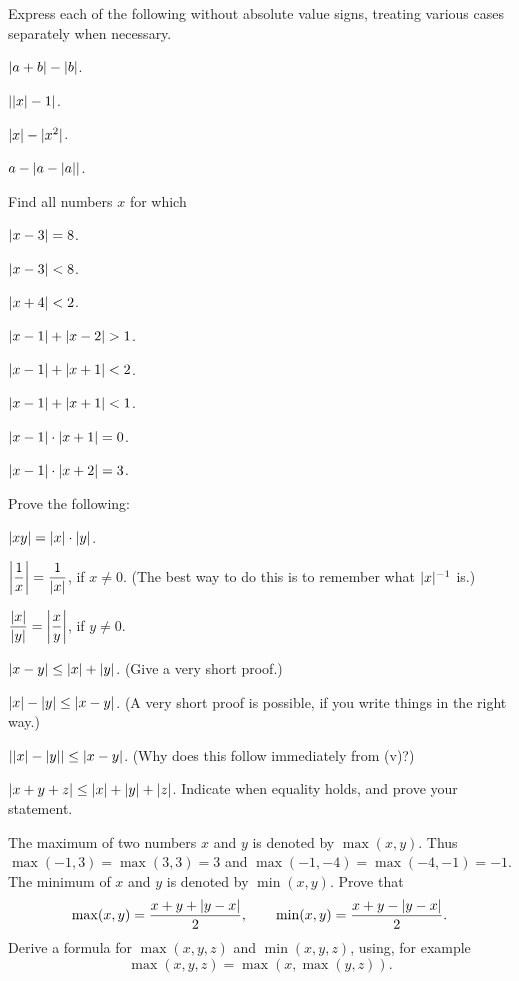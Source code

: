  Express each of the following without absolute value signs,
treating various cases separately when necessary.
\begin{romans}
\item $\abs{a+b} - \abs{b}$.
\item $\abs{\abs{x}-1}$.
\item $\abs{x} - \abs{x^2}$.
\item $a - \abs{a-\abs{a}}$.
\end{romans}

 Find all numbers $x$ for which
\begin{romans}
\item $\abs{x-3} = 8$.
\item $\abs{x-3} < 8$.
\item $\abs{x+4} < 2$.
\item $\abs{x-1} + \abs{x-2} > 1$.
\item $\abs{x-1} + \abs{x+1} < 2$.
\item $\abs{x-1} + \abs{x+1} < 1$.
\item $\abs{x-1} \cdot \abs{x+1} = 0$.
\item $\abs{x-1} \cdot \abs{x+2} = 3$.
\end{romans}

 Prove the following:
\begin{romans}
\item $\abs{xy} = \abs{x} \cdot \abs{y}$.
\item $\abs*{\dfrac{1}{x}} = \dfrac{1}{\abs{x}}$, if $x \neq 0$. (The best
  way to do this is to remember what $\abs{x}^{-1}$ is.)
\item $\dfrac{\abs{x}}{\abs{y}} = \abs*{\dfrac{x}{y}}$, if $y \neq 0$.
\item $\abs{x-y} \leq \abs{x} + \abs{y}$. (Give a very short proof.)
\item $\abs{x} - \abs{y} \leq \abs{x-y}$. (A very short proof is possible, if
  you write things in the right way.)
\item $\abs{\abs{x}-\abs{y}} \leq \abs{x-y}$. (Why does this follow immediately
  from (v)?)
\item $\abs{x+y+z} \leq \abs{x}+\abs{y}+\abs{z}$. Indicate when equality
  holds, and prove your statement.
\end{romans}

 The maximum of two numbers $x$ and $y$ is denoted by $\max(x,y)$.
Thus $\max(-1,3) = \max(3,3) = 3$ and $\max(-1,-4) = \max(-4,-1) = -1$. The
minimum of $x$ and $y$ is denoted by $\min(x,y)$. Prove that
\[
\max(x,y) = \frac{x + y + \abs{y-x}}{2},
\qquad
\min(x,y) = \frac{x + y - \abs{y-x}}{2}.
\]
Derive a formula for $\max(x,y,z)$ and $\min(x,y,z)$, using, for example
\[ \max(x,y,z) = \max(x,\max(y,z)). \]

